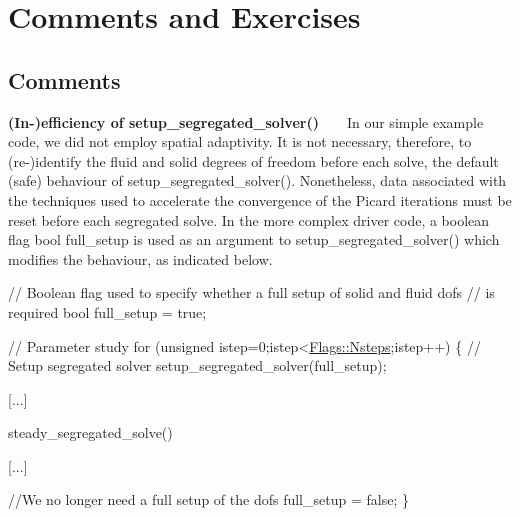  

\hypertarget{index_comments_and_ex}{}\section{Comments and Exercises}\label{index_comments_and_ex}
\hypertarget{index_comments}{}\subsection{Comments}\label{index_comments}

\begin{DoxyItemize}
\item {\bfseries (In-\/)efficiency of {\ttfamily setup\+\_\+segregated\+\_\+solver()}} ~\newline
~\newline
 In our simple example code, we did not employ spatial adaptivity. It is not necessary, therefore, to (re-\/)identify the fluid and solid degrees of freedom before each solve, the default (safe) behaviour of {\ttfamily setup\+\_\+segregated\+\_\+solver()}. Nonetheless, data associated with the techniques used to accelerate the convergence of the Picard iterations must be reset before each segregated solve. In the more complex driver code, a boolean flag {\ttfamily bool} {\ttfamily full\+\_\+setup} is used as an argument to {\ttfamily setup\+\_\+segregated\+\_\+solver()} which modifies the behaviour, as indicated below. 
\begin{DoxyCode}
\textcolor{comment}{// Boolean flag used to specify whether a full setup of solid and fluid dofs}
\textcolor{comment}{// is required}
\textcolor{keywordtype}{bool} full\_setup = \textcolor{keyword}{true};

\textcolor{comment}{// Parameter study}
\textcolor{keywordflow}{for} (\textcolor{keywordtype}{unsigned} istep=0;istep<\hyperlink{namespaceFlags_a8a6ffdb261330ef89965624209ab7b00}{Flags::Nsteps};istep++)
 \{
  \textcolor{comment}{// Setup segregated solver}
  setup\_segregated\_solver(full\_setup);

   [...]
 
  steady\_segregated\_solve()

   [...] 

  \textcolor{comment}{//We no longer need a full setup of the dofs}
  full\_setup = \textcolor{keyword}{false};
 \}
\end{DoxyCode}

\end{DoxyItemize}

 

